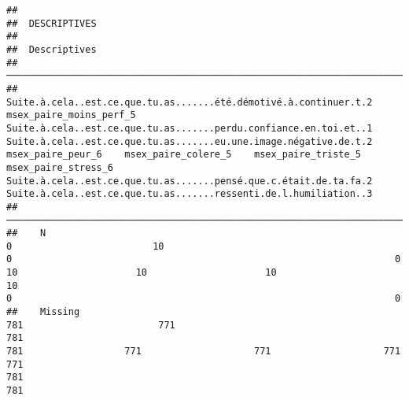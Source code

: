 \documentclass[
]{article}
\begin{document}
\begin{verbatim}
## 
##  DESCRIPTIVES
## 
##  Descriptives                                                                                                                                                                                                                                                                                                                                                                                                                                                                              
##  ───────────────────────────────────────────────────────────────────────────────────────────────────────────────────────────────────────────────────────────────────────────────────────────────────────────────────────────────────────────────────────────────────────────────────────────────────────────────────────────────────────────────────────────────────────────────────────────────────────────────────────────────────────────────────────────────────────────────────────── 
##               Suite.à.cela..est.ce.que.tu.as.......été.démotivé.à.continuer.t.2    msex_paire_moins_perf_5    Suite.à.cela..est.ce.que.tu.as.......perdu.confiance.en.toi.et..1    Suite.à.cela..est.ce.que.tu.as.......eu.une.image.négative.de.t.2    msex_paire_peur_6    msex_paire_colere_5    msex_paire_triste_5    msex_paire_stress_6    Suite.à.cela..est.ce.que.tu.as.......pensé.que.c.était.de.ta.fa.2    Suite.à.cela..est.ce.que.tu.as.......ressenti.de.l.humiliation..3   
##  ───────────────────────────────────────────────────────────────────────────────────────────────────────────────────────────────────────────────────────────────────────────────────────────────────────────────────────────────────────────────────────────────────────────────────────────────────────────────────────────────────────────────────────────────────────────────────────────────────────────────────────────────────────────────────────────────────────────────────────── 
##    N                                                                          0                         10                                                                    0                                                                    0                   10                     10                     10                     10                                                                    0                                                                    0   
##    Missing                                                                  781                        771                                                                  781                                                                  781                  771                    771                    771                    771                                                                  781                                                                  781   

\end{verbatim}
\end{document}
